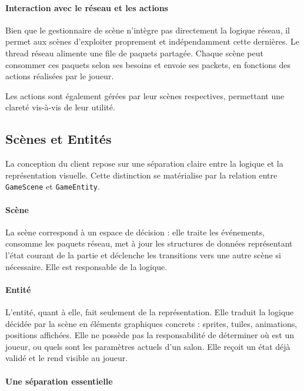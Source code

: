 \documentclass[a4paper, 11pt]{article}
\begin{document}
\paragraph{Interaction avec le réseau et les actions}

Bien que le gestionnaire de scène n’intègre pas directement la logique réseau, il permet aux scènes d'exploiter proprement et indépendamment cette dernières.
Le thread réseau alimente une file de paquets partagée.
Chaque scène peut consommer ces paquets selon ses besoins et envoie ses packets, en fonctions des actions réalisées par le joueur.

Les actions sont également gérées par leur scènes respectives, permettant une clareté vis-à-vis de leur utilité.

\subsection{Scènes et Entités}

La conception du client repose sur une séparation claire entre la logique et la représentation visuelle.
Cette distinction se matérialise par la relation entre \texttt{GameScene} et \texttt{GameEntity}.

\paragraph{Scène}

La scène correspond à un espace de décision : elle traite les événements, consomme les paquets réseau, met à jour les structures de données représentant l’état courant de la partie et déclenche les transitions vers une autre scène si nécessaire. Elle est responsable de la logique.

\paragraph{Entité}

L’entité, quant à elle, fait seulement de la représentation. Elle traduit la logique décidée par la scène en éléments graphiques concrets : sprites, tuiles, animations, positions affichées.
Elle ne possède pas la responsabilité de déterminer où est un joueur, ou quels sont les paramètres actuels d'un salon.
Elle reçoit un état déjà validé et le rend visible au joueur.

\paragraph{Une séparation essentielle}
\end{document}
